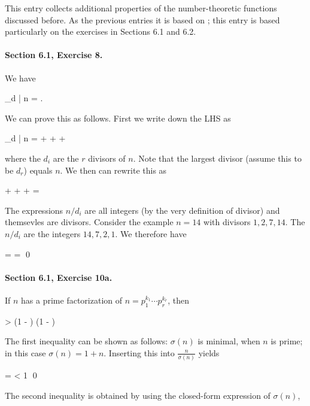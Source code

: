 
This entry collects additional properties of the number-theoretic functions discussed before. As the previous entries it is based on \cite{Burton2011}; this entry is based particularly on the exercises in Sections 6.1 and 6.2.


\paragraph{Section 6.1, Exercise 8.} We have

\bee
\sum_{d | n}  = .
\eee

We can prove this as follows. First we write down the LHS as

\bee
\sum_{d | n}  =  +  + \cdots + 
\eee

where the $d_i$ are the $r$ divisors of $n$. Note that the largest divisor (assume this to be $d_r$) equals $n$. We then can rewrite this as

\bee
{} +  + \cdots +  = 
\eee

The expressions $n/d_i$ are all integers (by the very definition of divisor) and themsevles are divisors. Consider the example $n = 14$ with divisors $1, 2, 7, 14$. The $n / d_i$ are the integers $14, 7, 2, 1$. We therefore have

\bee
{} =  =  \qed
\eee

\paragraph{Section 6.1, Exercise 10a.} If $n$ has a prime factorization of $n = p_1^{k_1} \cdots p_r^{k_r}$, then

 \geq {} > \left(1 - \right) \cdots \left(1 - \right)
\eee

The first inequality can be shown as follows: $\sigma(n)$ is minimal, when $n$ is prime; in this case $\sigma(n) = 1 + n$. Inserting this into $\frac{n}{\sigma(n)}$ yields

\bee
{} =  < 1 \qed
\eee

The second inequality is obtained by using the closed-form expression of $\sigma(n)$,

